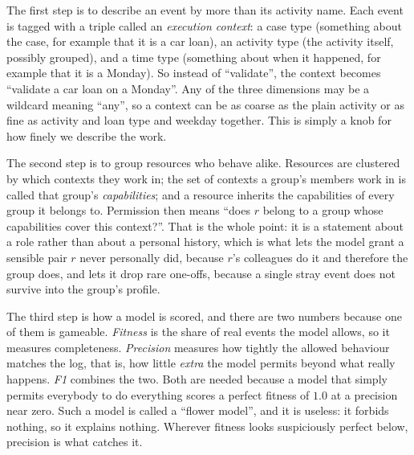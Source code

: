 The first step is to describe an event by more than its activity name. Each
event is tagged with a triple called an \emph{execution context}: a case type
(something about the case, for example that it is a car loan), an activity type
(the activity itself, possibly grouped), and a time type (something about when
it happened, for example that it is a Monday). So instead of ``validate'', the
context becomes ``validate a car loan on a Monday''. Any of the three
dimensions may be a wildcard meaning ``any'', so a context can be as coarse as
the plain activity or as fine as activity and loan type and weekday together.
This is simply a knob for how finely we describe the work.

The second step is to group resources who behave alike. Resources are clustered
by which contexts they work in; the set of contexts a group's members work in
is called that group's \emph{capabilities}; and a resource inherits the
capabilities of every group it belongs to. Permission then means ``does $r$
belong to a group whose capabilities cover this context?''. That is the whole
point: it is a statement about a role rather than about a personal history,
which is what lets the model grant a sensible pair $r$ never personally did,
because $r$'s colleagues do it and therefore the group does, and lets it drop
rare one-offs, because a single stray event does not survive into the group's
profile.

The third step is how a model is scored, and there are two numbers because one
of them is gameable. \emph{Fitness} is the share of real events the model
allows, so it measures completeness. \emph{Precision} measures how tightly the
allowed behaviour matches the log, that is, how little \emph{extra} the model
permits beyond what really happens. \emph{F1} combines the two. Both are needed
because a model that simply permits everybody to do everything scores a perfect
fitness of $1.0$ at a precision near zero. Such a model is called a ``flower
model'', and it is useless: it forbids nothing, so it explains nothing. Wherever
fitness looks suspiciously perfect below, precision is what catches it.

